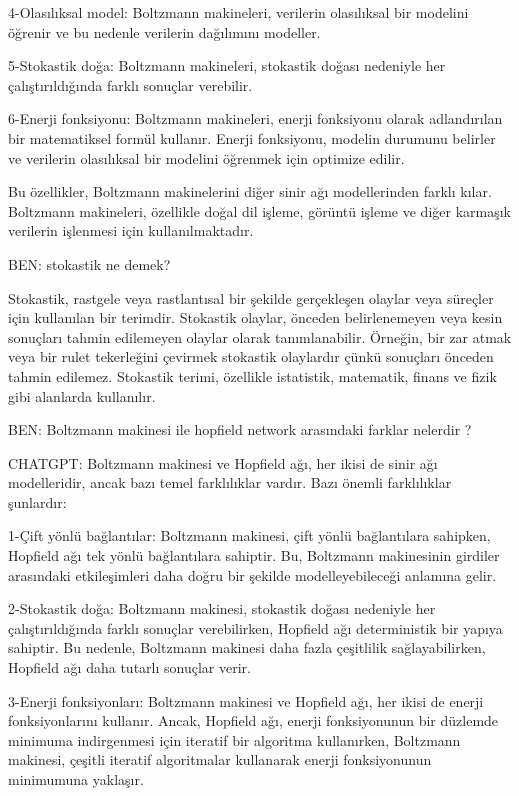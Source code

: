 \documentclass[11pt]{article}
\begin{document}
4-Olasılıksal model: Boltzmann makineleri, verilerin olasılıksal bir modelini öğrenir ve bu nedenle verilerin dağılımını modeller.

5-Stokastik doğa: Boltzmann makineleri, stokastik doğası nedeniyle her çalıştırıldığında farklı sonuçlar verebilir.

6-Enerji fonksiyonu: Boltzmann makineleri, enerji fonksiyonu olarak adlandırılan bir matematiksel formül kullanır. Enerji fonksiyonu, modelin durumunu belirler ve verilerin olasılıksal bir modelini öğrenmek için optimize edilir.

Bu özellikler, Boltzmann makinelerini diğer sinir ağı modellerinden farklı kılar. Boltzmann makineleri, özellikle doğal dil işleme, görüntü işleme ve diğer karmaşık verilerin işlenmesi için kullanılmaktadır.

BEN: stokastik ne demek?

Stokastik, rastgele veya rastlantısal bir şekilde gerçekleşen olaylar veya süreçler için kullanılan bir terimdir. Stokastik olaylar, önceden belirlenemeyen veya kesin sonuçları tahmin edilemeyen olaylar olarak tanımlanabilir. Örneğin, bir zar atmak veya bir rulet tekerleğini çevirmek stokastik olaylardır çünkü sonuçları önceden tahmin edilemez. Stokastik terimi, özellikle istatistik, matematik, finans 
ve fizik gibi alanlarda kullanılır.

BEN: Boltzmann makinesi ile hopfield network arasındaki farklar nelerdir ?

CHATGPT: Boltzmann makinesi ve Hopfield ağı, her ikisi de sinir ağı modelleridir, ancak bazı temel farklılıklar vardır. Bazı önemli farklılıklar şunlardır:

1-Çift yönlü bağlantılar: Boltzmann makinesi, çift yönlü bağlantılara sahipken, Hopfield ağı tek yönlü bağlantılara sahiptir. Bu, Boltzmann makinesinin girdiler arasındaki etkileşimleri daha doğru bir şekilde modelleyebileceği anlamına gelir.

2-Stokastik doğa: Boltzmann makinesi, stokastik doğası nedeniyle her çalıştırıldığında farklı sonuçlar verebilirken, Hopfield ağı deterministik bir yapıya sahiptir. Bu nedenle, Boltzmann makinesi daha fazla çeşitlilik sağlayabilirken, Hopfield ağı daha tutarlı sonuçlar verir.

3-Enerji fonksiyonları: Boltzmann makinesi ve Hopfield ağı, her ikisi de enerji fonksiyonlarını kullanır. Ancak, Hopfield ağı, enerji fonksiyonunun bir düzlemde minimuma indirgenmesi için iteratif bir algoritma kullanırken, Boltzmann makinesi, çeşitli iteratif algoritmalar kullanarak enerji fonksiyonunun minimumuna yaklaşır.
\end{document}
